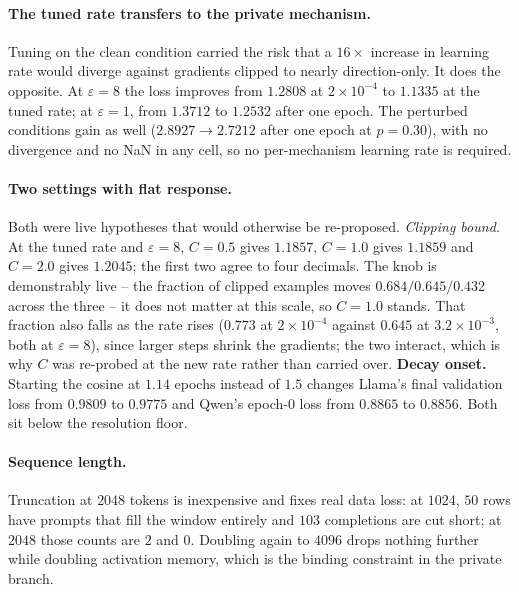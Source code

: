 \paragraph{The tuned rate transfers to the private mechanism.}
Tuning on the clean condition carried the risk that a $16\times$ increase in learning rate would diverge against gradients clipped to nearly direction-only.
It does the opposite.
At $\varepsilon = 8$ the loss improves from $1.2808$ at $2\times10^{-4}$ to $1.1335$ at the tuned rate;
at $\varepsilon = 1$,
from $1.3712$ to $1.2532$ after one epoch.
The perturbed conditions gain as well ($2.8927 \to 2.7212$ after one epoch at $p{=}0.30$),
with no divergence and no NaN in any cell,
so no per-mechanism learning rate is required.

\paragraph{Two settings with flat response.}
Both were live hypotheses that would otherwise be re-proposed.
\textit{Clipping bound.} At the tuned rate and $\varepsilon = 8$,
$C = 0.5$ gives $1.1857$,
$C = 1.0$ gives $1.1859$ and $C = 2.0$ gives $1.2045$;
the first two agree to four decimals.
The knob is demonstrably live -- the fraction of clipped examples moves $0.684 / 0.645 / 0.432$ across the three -- it does not matter at this scale,
so $C = 1.0$ stands.
That fraction also falls as the rate rises ($0.773$ at $2\times10^{-4}$ against $0.645$ at $3.2\times10^{-3}$, both at $\varepsilon = 8$),
since larger steps shrink the gradients;
the two interact,
which is why $C$ was re-probed at the new rate rather than carried over.
\textbf{Decay onset.} Starting the cosine at $1.14$ epochs instead of $1.5$ changes Llama's final validation loss from $0.9809$ to $0.9775$ and Qwen's epoch-$0$ loss from $0.8865$ to $0.8856$.
Both sit below the resolution floor.

\paragraph{Sequence length.}
Truncation at $2048$ tokens is inexpensive and fixes real data loss:
at $1024$,
$50$ rows have prompts that fill the window entirely and $103$ completions are cut short;
at $2048$ those counts are $2$ and $0$. Doubling again to $4096$ drops nothing further while doubling activation memory,
which is the binding constraint in the private branch.

